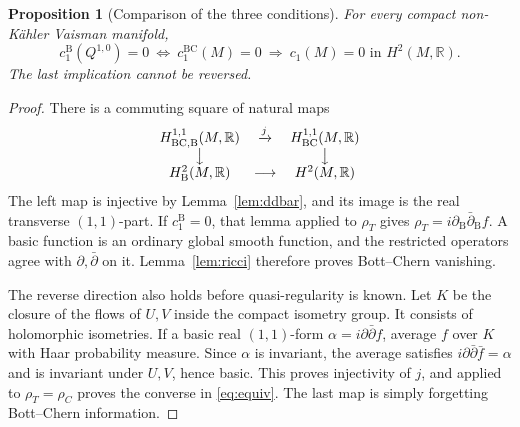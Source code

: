 \documentclass[12pt]{amsart}
\newtheorem{prop}[thm]{Proposition}
\theoremstyle{definition}
\theoremstyle{remark}
\numberwithin{equation}{section}
\newcommand{\R}{\mathbb{R}}
\newcommand{\BC}{\mathrm{BC}}
\newcommand{\bas}{\mathrm{B}}
\newcommand{\rhoT}{\rho_{T}}
\newcommand{\rhoC}{\rho_{C}}
\begin{document}
\begin{prop}[Comparison of the three conditions]\label{prop:bridge}
For every compact non-K\"ahler Vaisman manifold,
\begin{equation}\label{eq:equiv}
c_1^{\bas}(Q^{1,0})=0
\ \Longleftrightarrow\ c_1^{\BC}(M)=0
\ \Longrightarrow\ c_1(M)=0\text{ in }H^2(M,\R).
\end{equation}
The last implication cannot be reversed.
\end{prop}
\begin{proof}
There is a commuting square of natural maps
\[
\begin{array}{ccc}
H_{\BC,\bas}^{1,1}(M,\R)&\xrightarrow{j}&H_{\BC}^{1,1}(M,\R)\\
\big\downarrow&&\big\downarrow\\
H_{\bas}^{2}(M,\R)&\longrightarrow&H^{2}(M,\R)
\end{array}
\]
The left map is injective by Lemma~\ref{lem:ddbar}, and its image is the
real transverse $(1,1)$-part. If $c_1^{\bas}=0$, that lemma applied to
$\rhoT$ gives $\rhoT=i\partial_{\bas}\bar\partial_{\bas}f$.
A basic function is an ordinary global smooth function, and the restricted
operators agree with $\partial,\bar\partial$ on it.
Lemma~\ref{lem:ricci} therefore proves Bott--Chern vanishing.

The reverse direction also holds before quasi-regularity is known.
Let $K$ be the closure of the flows of $U,V$ inside the compact isometry
group. It consists of holomorphic isometries. If a basic real $(1,1)$-form
$\alpha=i\partial\bar\partial f$, average $f$ over $K$ with Haar
probability measure. Since $\alpha$ is invariant, the average satisfies
$i\partial\bar\partial\bar f=\alpha$ and is invariant under $U,V$,
hence basic. This proves injectivity of $j$, and applied to $\rhoT=\rhoC$
proves the converse in \eqref{eq:equiv}. The last map is simply forgetting
Bott--Chern information.
\end{proof}
\end{document}
